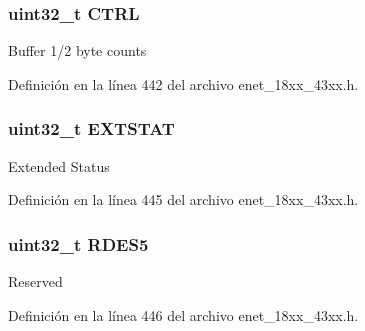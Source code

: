 \subsubsection[{\texorpdfstring{C\+T\+RL}{CTRL}}]{ uint32\+\_\+t C\+T\+RL}\hypertarget{struct_e_n_e_t___e_n_h_r_x_d_e_s_c___t_a15fc8d35f045f329b80c544bef35ff64}{}\label{struct_e_n_e_t___e_n_h_r_x_d_e_s_c___t_a15fc8d35f045f329b80c544bef35ff64}
Buffer 1/2 byte counts 

Definición en la línea 442 del archivo enet\+\_\+18xx\+\_\+43xx.\+h.

\subsubsection[{\texorpdfstring{E\+X\+T\+S\+T\+AT}{EXTSTAT}}]{ uint32\+\_\+t E\+X\+T\+S\+T\+AT}\hypertarget{struct_e_n_e_t___e_n_h_r_x_d_e_s_c___t_a900e621c36e68c7d442239eab19112d8}{}\label{struct_e_n_e_t___e_n_h_r_x_d_e_s_c___t_a900e621c36e68c7d442239eab19112d8}
Extended Status 

Definición en la línea 445 del archivo enet\+\_\+18xx\+\_\+43xx.\+h.

\subsubsection[{\texorpdfstring{R\+D\+E\+S5}{RDES5}}]{ uint32\+\_\+t R\+D\+E\+S5}\hypertarget{struct_e_n_e_t___e_n_h_r_x_d_e_s_c___t_a1db082c340933c5dc8ac865eae4fac82}{}\label{struct_e_n_e_t___e_n_h_r_x_d_e_s_c___t_a1db082c340933c5dc8ac865eae4fac82}
Reserved 

Definición en la línea 446 del archivo enet\+\_\+18xx\+\_\+43xx.\+h.

